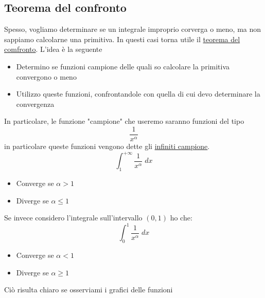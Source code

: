 \subsection{Teorema del confronto}
Spesso, vogliamo determinare se un integrale improprio corverga o meno, ma non sappiamo calcolarne una primitiva. In questi casi torna utile il \underline{teorema del comfronto}. L'idea è la seguente
\begin{itemize}
	\item Determino se funzioni campione delle quali so calcolare la primitiva convergono o meno
	\item Utilizzo queste funzioni, confrontandole con quella di cui devo determinare la convergenza
\end{itemize}
In particolare, le funzione "campione" che useremo saranno funzioni del tipo
\[
	\frac{1}{x^{\alpha }}
\]
in particolare queste funzioni vengono dette gli \underline{infiniti campione}.
\[
	\int_{1}^{+\infty} \frac{1}{x^{\alpha }} \; dx
\]
\begin{itemize}
	\item Converge se $ \alpha  >1 $
	\item Diverge se $ \alpha \le 1 $
\end{itemize}
Se invece considero l'integrale sull'intervallo $ \left( 0,1 \right)  $ ho che:
\[
	\int_{0}^{1} \frac{1}{x^{\alpha }} \; dx
\]
\begin{itemize}
	\item Converge se $ \alpha < 1 $
	\item Diverge se $ \alpha  \ge 1 $
\end{itemize}
Ciò risulta chiaro se osserviami i grafici delle funzioni
\begin{center}
\end{center}
